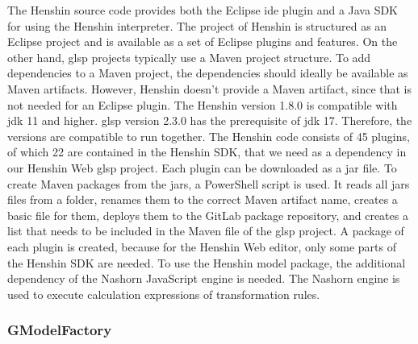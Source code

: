   The Henshin source code provides both the Eclipse \ac{ide} plugin and a Java SDK for using the Henshin interpreter. The project of Henshin is structured as an Eclipse project and is available as a set of Eclipse plugins and features. \cite{henshin-repo} On the other hand, \ac{glsp} projects typically use a Maven project structure. \cite{glsp-repo} To add dependencies to a Maven project, the dependencies should ideally be available as Maven artifacts. However, Henshin doesn't provide a Maven artifact, since that is not needed for an Eclipse plugin. The Henshin version 1.8.0 is compatible with \acs{jdk} 11 and higher. \ac{glsp} version 2.3.0 has the prerequisite of \acs{jdk} 17. Therefore, the versions are compatible to run together. The Henshin code consists of 45 plugins, of which 22 are contained in the Henshin SDK, that we need as a dependency in our Henshin Web \ac{glsp} project. Each plugin can be downloaded as a \acs{jar} file. To create Maven packages from the \acsp{jar}, a PowerShell script is used. It reads all \acsp{jar} files from a folder, renames them to the correct Maven artifact name, creates a basic  file for them, deploys them to the GitLab package repository, and creates a list that needs to be included in the Maven  file of the \ac{glsp} project. A package of each plugin is created, because for the Henshin Web editor, only some parts of the Henshin SDK are needed. To use the Henshin model package, the additional dependency of the Nashorn JavaScript engine \cite{nashorn-repo} is needed. The Nashorn engine is used to execute calculation expressions of transformation rules. \cite{henshin}

  \subsubsection{GModelFactory}
  \label{subsec:gmodel-factory}

